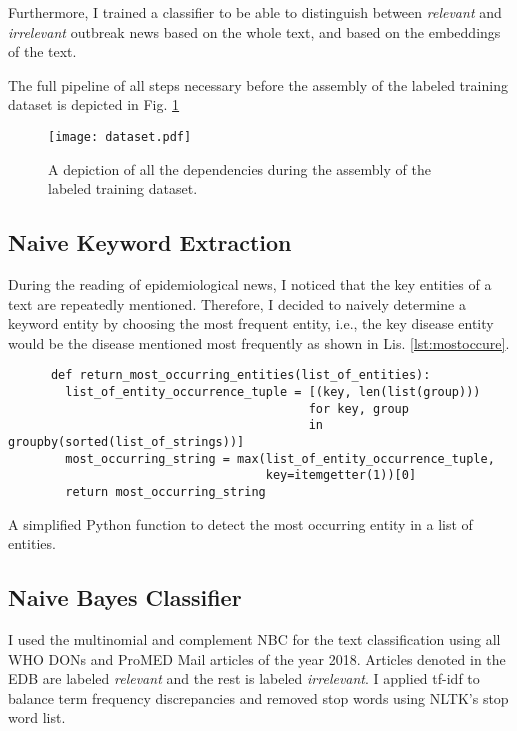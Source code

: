   Furthermore, I trained a classifier to be able to distinguish between \textsl{relevant} and \textsl{irrelevant} outbreak news based on the whole text, and based on the embeddings of the text.

  The full pipeline of all steps necessary before the assembly of the labeled training dataset is depicted in Fig. \ref{fig:dataset}

  \begin{figure}[h!]
    \centering
    \texttt{[image: dataset.pdf]}
    \caption{A depiction of all the dependencies during the assembly of the labeled training dataset.}
    \label{fig:dataset}
  \end{figure}

\subsection{Naive Keyword Extraction}
  During the reading of epidemiological news, I noticed that the key entities of a text are repeatedly mentioned.
  Therefore, I decided to naively determine a keyword entity by choosing the most frequent entity, i.e., the key disease entity would be the disease mentioned most frequently as shown in Lis. \ref{lst:mostoccure}.
  \begin{listing}[h!]
    \begin{verbatim}
      def return_most_occurring_entities(list_of_entities):
        list_of_entity_occurrence_tuple = [(key, len(list(group)))
                                          for key, group
                                          in groupby(sorted(list_of_strings))]
        most_occurring_string = max(list_of_entity_occurrence_tuple,
                                    key=itemgetter(1))[0]
        return most_occurring_string
    \end{verbatim}
    \caption{A simplified Python function to detect the most occurring entity in a list of entities.}
    \label{lst:mostoccure}
  \end{listing}

\subsection{Naive Bayes Classifier}\label{iskey}
  I used the multinomial and complement NBC for the text classification using all WHO DONs and ProMED Mail articles of the year 2018.
  Articles denoted in the EDB are labeled \textsl{relevant} and the rest is labeled \textsl{irrelevant}.
  I applied tf-idf to balance term frequency discrepancies and removed stop words using NLTK's stop word list.

